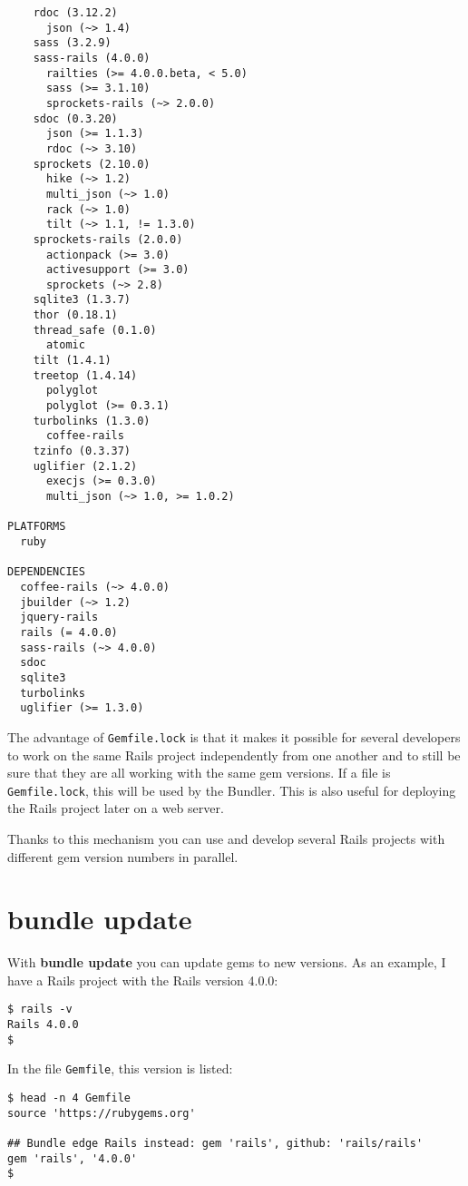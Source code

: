 \documentclass[a4paper]{book}
\begin{document}
\begin{shaded}
\begin{verbatim}
    rdoc (3.12.2)
      json (~> 1.4)
    sass (3.2.9)
    sass-rails (4.0.0)
      railties (>= 4.0.0.beta, < 5.0)
      sass (>= 3.1.10)
      sprockets-rails (~> 2.0.0)
    sdoc (0.3.20)
      json (>= 1.1.3)
      rdoc (~> 3.10)
    sprockets (2.10.0)
      hike (~> 1.2)
      multi_json (~> 1.0)
      rack (~> 1.0)
      tilt (~> 1.1, != 1.3.0)
    sprockets-rails (2.0.0)
      actionpack (>= 3.0)
      activesupport (>= 3.0)
      sprockets (~> 2.8)
    sqlite3 (1.3.7)
    thor (0.18.1)
    thread_safe (0.1.0)
      atomic
    tilt (1.4.1)
    treetop (1.4.14)
      polyglot
      polyglot (>= 0.3.1)
    turbolinks (1.3.0)
      coffee-rails
    tzinfo (0.3.37)
    uglifier (2.1.2)
      execjs (>= 0.3.0)
      multi_json (~> 1.0, >= 1.0.2)

PLATFORMS
  ruby

DEPENDENCIES
  coffee-rails (~> 4.0.0)
  jbuilder (~> 1.2)
  jquery-rails
  rails (= 4.0.0)
  sass-rails (~> 4.0.0)
  sdoc
  sqlite3
  turbolinks
  uglifier (>= 1.3.0)
\end{verbatim}\end{shaded}

The advantage of \texttt{Gemfile.lock} is that it makes it possible for several developers to work on the same Rails project independently from one another and to still be sure that they are all working with the same gem versions. If a file is \texttt{Gemfile.lock}, this will be used by the Bundler. This is also useful for deploying the Rails project later on a web server.

Thanks to this mechanism you can use and develop several Rails projects with different gem version numbers in parallel.

\section{bundle update}\label{bundle-update}

With \textbf{bundle update} you can update gems to new versions. As an example, I have a Rails project with the Rails version 4.0.0:

\begin{shaded}\begin{verbatim}
$ rails -v
Rails 4.0.0
$
\end{verbatim}\end{shaded}

In the file \texttt{Gemfile}, this version is listed:

\begin{shaded}\begin{verbatim}
$ head -n 4 Gemfile
source 'https://rubygems.org'

## Bundle edge Rails instead: gem 'rails', github: 'rails/rails'
gem 'rails', '4.0.0'
$
\end{verbatim}\end{shaded}
\end{document}
